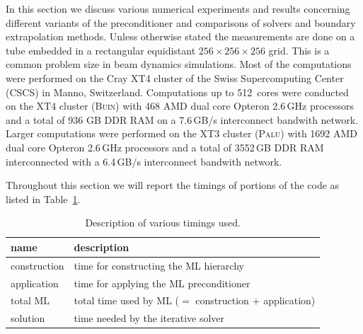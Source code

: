 \documentclass[a4paper,10pt,3p,final,pdftex]{elsarticle}
\begin{document}
In this section we discuss various numerical experiments and results
concerning different variants of the preconditioner and comparisons of
solvers and boundary extrapolation methods.  Unless otherwise stated the
measurements are done on a tube embedded in a rectangular equidistant
$256\times256\times256$ grid.  This is a common problem size in beam
dynamics simulations.  Most of the computations were performed on the
Cray XT4 cluster of the Swiss Supercomputing Center (CSCS) in Manno,
Switzerland. Computations up to 512~cores were conducted on the XT4
cluster (\textsc{Buin}) with 468 AMD dual core Opteron 2.6\,GHz
processors and a total of 936 GB DDR RAM on a 7.6\,GB/s interconnect
bandwith network.  Larger computations were performed on the XT3 cluster
(\textsc{Palu}) with 1692 AMD dual core Opteron 2.6\,GHz processors and a
total of 3552\,GB DDR RAM interconnected with a 6.4\,GB/s interconnect
bandwith network.

Throughout this section we will report the timings of portions of the
code as listed in Table~\ref{tbl:timings_description}.
\begin{table}[ht]
  \begin{center}
    \begin{tabular}{ll}
      \hline
      name & description \\
      \hline
      construction & time for constructing the ML hierarchy \\
      application  & time for applying the ML preconditioner \\
      total ML     & total time used by ML ($=$ construction $+$ application) \\
      solution     & time needed by the iterative solver \\
      \hline
    \end{tabular}
    \caption{Description of various timings used.}
    \label{tbl:timings_description}
  \end{center}
\end{table}
\end{document}
